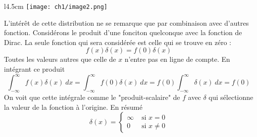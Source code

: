 \begin{wrapfigure}[7]{l}{4.5cm}
\vspace{-17mm}
\texttt{[image: ch1/image2.png]}
\end{wrapfigure}
L'intérêt de cette distribution ne se remarque que par combinaison avec d'autres 
fonction. Considérons le produit d'une fonciton quelconque avec la fonction de 
Dirac. La seule fonction qui sera considérée est celle qui se trouve en zéro :
\begin{equation}
f(x)\delta(x) = f(0)\delta(x)
\end{equation}
Toutes les valeurs autres que celle de $x$ n'entre pas en ligne de compte. En 
intégrant ce produit 
\begin{equation}
\int_{-\infty}^{\infty} f(x)\delta(x)\ dx = \int_{-\infty}^\infty f(0)\delta(x)\ dx
= f(0)\int_{-\infty}^{\infty}\delta(x)\ dx = f(0)
\end{equation}
On voit que cette intégrale comme le "produit-scalaire" de $f$ avec $\delta$ qui 
sélectionne la valeur de la fonction à l'origine. En résumé
\begin{equation}
\delta(x) = \left\{\begin{array}{ll}
\infty & \text{ si } x = 0\\
0 & \text{ si } x \neq 0
\end{array} \right.
\end{equation}

